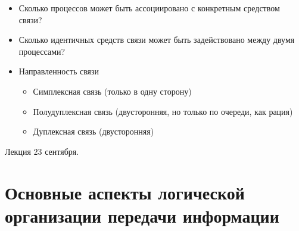 \documentclass[12pt, a4paper]{article}
\begin{document}
    \begin{itemize}
        \item Сколько процессов может быть ассоциировано с конкретным средством связи?
        \item Сколько идентичных средств связи может быть задействовано между двумя процессами?
        \item Направленность связи
        \begin{itemize}
            \item Симплексная связь (только в одну сторону)
            \item Полудуплексная связь (двусторонняя, но только по очереди, как рация)
            \item Дуплексная связь (двусторонняя)
        \end{itemize}
    \end{itemize}
    \begin{center}
        Лекция 23 сентября.
    \end{center}
    \section*{Основные аспекты логической организации передачи информации}
\end{document}
